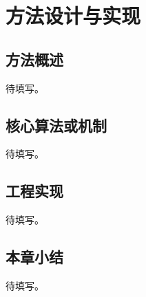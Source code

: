 \chapter{方法设计与实现}

\section{方法概述}
待填写。

\section{核心算法或机制}
待填写。

\section{工程实现}
待填写。

\section{本章小结}
待填写。
